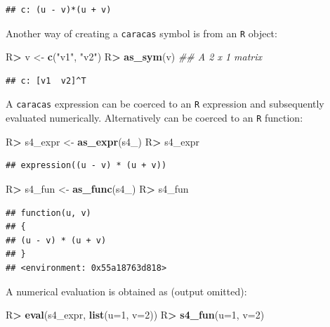\documentclass[10pt,]{article}
\newenvironment{Shaded}{\begin{snugshade}}{\end{snugshade}}
\newcommand{\CommentTok}[1]{\textcolor[rgb]{0.56,0.35,0.01}{\textit{#1}}}
\newcommand{\DataTypeTok}[1]{\textcolor[rgb]{0.13,0.29,0.53}{#1}}
\newcommand{\DecValTok}[1]{\textcolor[rgb]{0.00,0.00,0.81}{#1}}
\newcommand{\KeywordTok}[1]{\textcolor[rgb]{0.13,0.29,0.53}{\textbf{#1}}}
\newcommand{\NormalTok}[1]{#1}
\newcommand{\OperatorTok}[1]{\textcolor[rgb]{0.81,0.36,0.00}{\textbf{#1}}}
\newcommand{\StringTok}[1]{\textcolor[rgb]{0.31,0.60,0.02}{#1}}
\begin{document}
\begin{verbatim}
## c: (u - v)*(u + v)
\end{verbatim}

Another way of creating a \texttt{caracas} symbol is from an \texttt{R}
object:

\begin{Shaded}
\begin{Highlighting}[]
\NormalTok{R}\OperatorTok{>}\StringTok{ }\NormalTok{v <-}\StringTok{ }\KeywordTok{c}\NormalTok{(}\StringTok{"v1"}\NormalTok{, }\StringTok{"v2"}\NormalTok{)}
\NormalTok{R}\OperatorTok{>}\StringTok{ }\KeywordTok{as_sym}\NormalTok{(v) }\CommentTok{## A 2 x 1 matrix}
\end{Highlighting}
\end{Shaded}

\begin{verbatim}
## c: [v1  v2]^T
\end{verbatim}

A \texttt{caracas} expression can be coerced to an \texttt{R} expression
and subsequently evaluated numerically. Alternatively can be coerced to
an \texttt{R} function:

\begin{Shaded}
\begin{Highlighting}[]
\NormalTok{R}\OperatorTok{>}\StringTok{ }\NormalTok{s4_expr <-}\StringTok{ }\KeywordTok{as_expr}\NormalTok{(s4_)}
\NormalTok{R}\OperatorTok{>}\StringTok{ }\NormalTok{s4_expr}
\end{Highlighting}
\end{Shaded}

\begin{verbatim}
## expression((u - v) * (u + v))
\end{verbatim}

\begin{Shaded}
\begin{Highlighting}[]
\NormalTok{R}\OperatorTok{>}\StringTok{ }\NormalTok{s4_fun <-}\StringTok{ }\KeywordTok{as_func}\NormalTok{(s4_)}
\NormalTok{R}\OperatorTok{>}\StringTok{ }\NormalTok{s4_fun}
\end{Highlighting}
\end{Shaded}

\begin{verbatim}
## function(u, v)
## { 
## (u - v) * (u + v)
## }
## <environment: 0x55a18763d818>
\end{verbatim}

A numerical evaluation is obtained as (output omitted):

\begin{Shaded}
\begin{Highlighting}[]
\NormalTok{R}\OperatorTok{>}\StringTok{ }\KeywordTok{eval}\NormalTok{(s4_expr, }\KeywordTok{list}\NormalTok{(}\DataTypeTok{u=}\DecValTok{1}\NormalTok{, }\DataTypeTok{v=}\DecValTok{2}\NormalTok{))}
\NormalTok{R}\OperatorTok{>}\StringTok{ }\KeywordTok{s4_fun}\NormalTok{(}\DataTypeTok{u=}\DecValTok{1}\NormalTok{, }\DataTypeTok{v=}\DecValTok{2}\NormalTok{)}
\end{Highlighting}
\end{Shaded}


\end{document}
